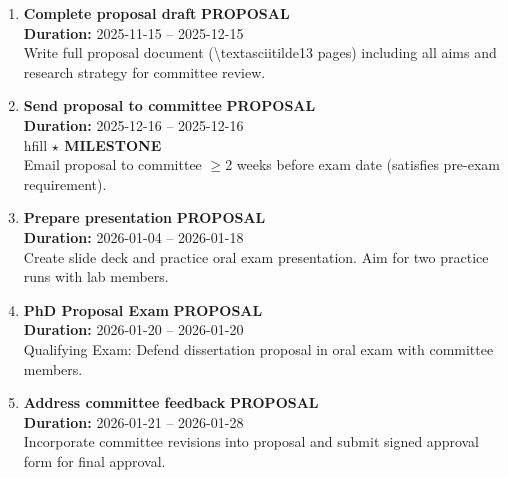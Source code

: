 \documentclass[a4paper]{article}
\newcommand{\cellcolor}[2]{\colorbox{#1}{#2}}
\begin{document}
\begin{enumerate}[leftmargin=0.3cm, itemsep=0.3em, parsep=0.1em, topsep=0.1em]
    \item \textcolor{researchcore}{\textbf{\Large Complete proposal draft}}
          \hfill \cellcolor{researchcore!15}{\textbf{\small PROPOSAL}}
          \\ \textcolor{black!60}{\textbf{Duration:} 2025-11-15 -- 2025-12-15} \\ \textcolor{black!80}{\small Write full proposal document (\textbackslash{}textasciitilde{}13 pages) including all aims and research strategy for committee review.}

    \item \textcolor{researchcore}{\textbf{\Large Send proposal to committee}}
          \hfill \cellcolor{researchcore!15}{\textbf{\small PROPOSAL}}
          \\ \textcolor{black!60}{\textbf{Duration:} 2025-12-16 -- 2025-12-16} \\hfill \textcolor{milestone}{\textbf{$\star$ MILESTONE}} \\ \textcolor{black!80}{\small Email proposal to committee $\geq$2 weeks before exam date (satisfies pre-exam requirement).}

    \item \textcolor{researchcore}{\textbf{\Large Prepare presentation}}
          \hfill \cellcolor{researchcore!15}{\textbf{\small PROPOSAL}}
          \\ \textcolor{black!60}{\textbf{Duration:} 2026-01-04 -- 2026-01-18} \\ \textcolor{black!80}{\small Create slide deck and practice oral exam presentation. Aim for two practice runs with lab members.}

    \item \textcolor{researchcore}{\textbf{\Large PhD Proposal Exam}}
          \hfill \cellcolor{researchcore!15}{\textbf{\small PROPOSAL}}
          \\ \textcolor{black!60}{\textbf{Duration:} 2026-01-20 -- 2026-01-20} \\ \textcolor{black!80}{\small Qualifying Exam: Defend dissertation proposal in oral exam with committee members.}

    \item \textcolor{researchcore}{\textbf{\Large Address committee feedback}}
          \hfill \cellcolor{researchcore!15}{\textbf{\small PROPOSAL}}
          \\ \textcolor{black!60}{\textbf{Duration:} 2026-01-21 -- 2026-01-28} \\ \textcolor{black!80}{\small Incorporate committee revisions into proposal and submit signed approval form for final approval.}


\end{enumerate}
\end{document}
